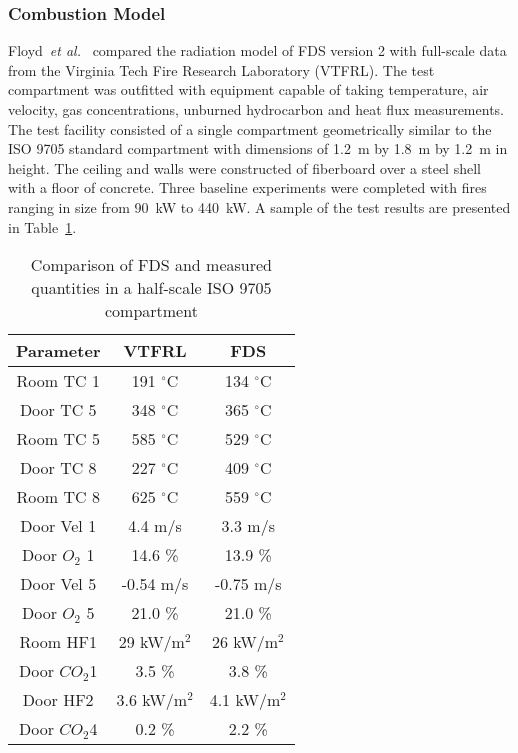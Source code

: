 \subsubsection{Combustion Model}

Floyd~{\em et al.}~\cite{Floyd:1,Floyd:6} compared the radiation model of  FDS version 2  with full-scale  data from  the Virginia  Tech Fire
Research Laboratory (VTFRL).  The  test compartment was outfitted with equipment   capable   of  taking   temperature,   air  velocity,   gas
concentrations, unburned hydrocarbon  and heat flux measurements.  The test facility consisted of  a single compartment geometrically similar to the
ISO 9705 standard compartment with dimensions of 1.2~m by 1.8~m by  1.2~m  in height.   The  ceiling  and  walls were  constructed  of fiberboard
over  a steel  shell  with  a  floor of  concrete.   Three baseline experiments  were completed with  fires ranging in  size from 90~kW  to 440~kW.
A  sample of  the  test results  are presented  in Table~\ref{grid3}.

\begin{table}
\begin{center}
\caption{Comparison of FDS and measured quantities in a half-scale ISO 9705 compartment \cite{Floyd:1}} \label{grid3} \vspace{0.1in}
\begin{tabular}{|*{3}{c|}} \hline
Parameter & VTFRL &  FDS \\ \hline \hline Room TC 1  & 191 $^\circ$C &
134 $^\circ$C \\  \hline Door TC 5 & 348 $^\circ$C  & 365 $^\circ$C \\
\hline Room TC 5 & 585 $^\circ$C & 529 $^\circ$C \\ \hline Door TC 8 & 227 $^\circ$C  & 409 $^\circ$C \\ \hline  Room TC 8 &  625 $^\circ$C & 559
$^\circ$C \\ \hline Door Vel 1  & 4.4 m/s & 3.3 m/s \\ \hline Door $O_{2}$ 1 & 14.6 \% & 13.9 \% \\ \hline Door Vel 5 & -0.54 m/s & -0.75 m/s \\
\hline Door $O_{2}$ 5 & 21.0  \% & 21.0 \% \\ \hline Room HF1 & 29 kW/m$^2$ & 26  kW/m$^2$ \\ \hline Door $CO_{2}$1 & 3.5  \% & 3.8 \%
\\  \hline Door  HF2 &  3.6  kW/m$^2$ &  4.1 kW/m$^2$  \\ \hline  Door
$CO_{2}$4 & 0.2 \% & 2.2 \% \\ \hline
\end{tabular}
\end{center}
\end{table}

